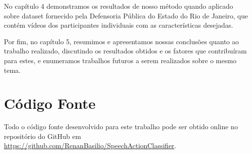No capítulo 4 demonstramos os resultados de nosso método quando aplicado sobre dataset fornecido pela Defensoria Pública do Estado do Rio de Janeiro, que contém vídeos dos participantes individuais com as características desejadas.

Por fim, no capítulo 5, resumimos e apresentamos nossas conclusões quanto ao trabalho realizado, discutindo os resultados obtidos e os fatores que contribuíram para estes, e enumeramos trabalhos futuros a serem realizados sobre o mesmo tema.

\section{Código Fonte}
\label{sec:source-code}

Todo o código fonte desenvolvido para este trabalho pode ser obtido online no repositório do GitHub em \url{https://github.com/RenanBasilio/SpeechActionClassifier}.